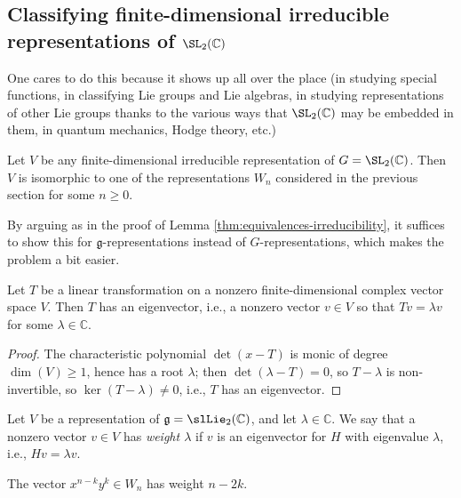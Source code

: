 \documentclass[reqno]{amsart} 
\begin{document}
\subsection{Classifying finite-dimensional irreducible representations of \texorpdfstring{$\SL_2(\mathbb{C})$}{SL2(C)}}
\label{sec:orgbd19a70}
One cares to do this because it shows up all over the place (in
studying special functions, in classifying Lie groups and Lie
algebras, in studying representations of other Lie groups thanks
to the various ways that $\SL_2(\mathbb{C})$ may be embedded in
them, in quantum mechanics, Hodge theory, etc.)

\begin{theorem}\label{thm:classify-irreps-sl2}
  Let $V$ be any finite-dimensional irreducible
  representation of $G = \SL_2(\mathbb{C})$.
  Then $V$ is isomorphic
  to one of the representations $W_n$
  considered in the previous section for some $n \geq 0$.
\end{theorem}
By arguing
as in the proof of Lemma
\ref{thm:equivalences-irreducibility},
it suffices to show
this for $\mathfrak{g}$-representations
instead of $G$-representations,
which makes the problem a bit easier.

\begin{lemma}\label{lem:linear-transformations-have-eigenvectors}
  Let $T$ be a linear transformation on a nonzero finite-dimensional
  complex vector space $V$.
  Then $T$ has an eigenvector,
  i.e., a nonzero vector $v \in V$
  so that $T v = \lambda v$ for some $\lambda \in \mathbb{C}$.
\end{lemma}
\begin{proof}
  The characteristic polynomial $\det(x - T)$
  is monic of degree $\dim(V) \geq 1$,
  hence has a root $\lambda$;
  then $\det(\lambda - T) = 0$,
  so $T - \lambda$ is non-invertible,
  so $\ker(T - \lambda) \neq 0$,
  i.e., $T$ has an eigenvector.
\end{proof}

\begin{definition}
  Let $V$ be a representation of $\mathfrak{g} =
  \slLie_2(\mathbb{C})$, and let $\lambda \in \mathbb{C}$.
  We say that a nonzero vector $v \in V$ has \emph{weight
    $\lambda$}
  if $v$ is an eigenvector
  for $H$ with eigenvalue $\lambda$,
  i.e.,
  $H v = \lambda v$.
\end{definition}
\begin{example}
  The vector $x^{n-k} y^k \in W_n$ has
  weight $n-2k$.
\end{example}
\end{document}
